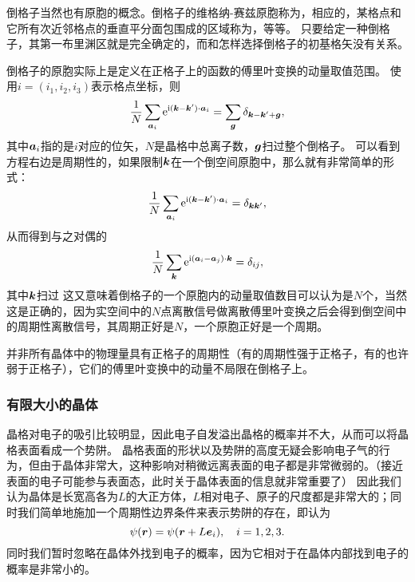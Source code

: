 倒格子当然也有原胞的概念。倒格子的维格纳-赛兹原胞称为，相应的，某格点和它所有次近邻格点的垂直平分面包围成的区域称为，等等。
只要给定一种倒格子，其第一布里渊区就是完全确定的，而和怎样选择倒格子的初基格矢没有关系。

倒格子的原胞实际上是定义在正格子上的函数的傅里叶变换的动量取值范围。
使用$i=(i_1, i_2, i_3)$表示格点坐标，则
\begin{equation}
    \frac{1}{N} \sum_{\vb*{a}_i} \mathrm{e}^{\mathrm{i} (\vb*{k} - \vb*{k}') \cdot \vb*{a}_i} = \sum_{\vb*{g}} \delta_{\vb*{k} - \vb*{k}' + \vb*{g}},
\end{equation}
其中$\vb*{a}_i$指的是$i$对应的位矢，$N$是晶格中总离子数，$\vb*{g}$扫过整个倒格子。
可以看到方程右边是周期性的，如果限制$\vb*{k}$在一个倒空间原胞中，那么就有非常简单的形式：
\begin{equation}
    \frac{1}{N} \sum_{\vb*{a}_i} \mathrm{e}^{\mathrm{i} (\vb*{k} - \vb*{k}') \cdot \vb*{a}_i} = \delta_{\vb*{k} \vb*{k}'},
\end{equation}
从而得到与之对偶的
\[
    \frac{1}{N} \sum_{\vb*{k}} \mathrm{e}^{\mathrm{i} (\vb*{a}_i - \vb*{a}_j) \cdot \vb*{k}} = \delta_{ij},
\]
其中$\vb*{k}$扫过
这又意味着倒格子的一个原胞内的动量取值数目可以认为是$N$个，当然这是正确的，因为实空间中的$N$点离散信号做离散傅里叶变换之后会得到倒空间中的周期性离散信号，其周期正好是$N$，一个原胞正好是一个周期。

并非所有晶体中的物理量具有正格子的周期性（有的周期性强于正格子，有的也许弱于正格子），它们的傅里叶变换中的动量不局限在倒格子上。

\subsubsection{有限大小的晶体}

晶格对电子的吸引比较明显，因此电子自发溢出晶格的概率并不大，从而可以将晶格表面看成一个势阱。
晶格表面的形状以及势阱的高度无疑会影响电子气的行为，但由于晶体非常大，这种影响对稍微远离表面的电子都是非常微弱的。（接近表面的电子可能参与表面态，此时关于晶体表面的信息就非常重要了）
因此我们认为晶体是长宽高各为$L$的大正方体，$L$相对电子、原子的尺度都是非常大的；同时我们简单地施加一个周期性边界条件来表示势阱的存在，即认为
\begin{equation}
    \psi(\vb*{r}) = \psi(\vb*{r} + L \vb*{e}_i), \quad i = 1, 2, 3.
    \label{eq:periodic-boundary}
\end{equation}
同时我们暂时忽略在晶体外找到电子的概率，因为它相对于在晶体内部找到电子的概率是非常小的。

